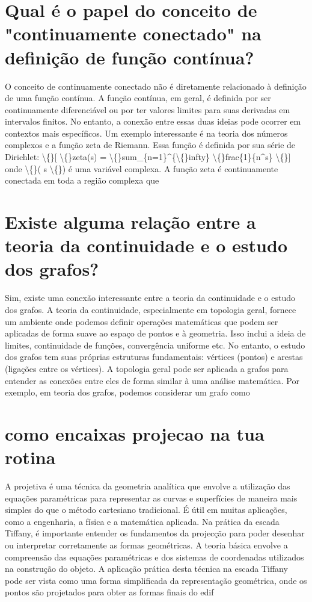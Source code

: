 \documentclass[11pt,a4paper]{article}
\begin{document}
\section{Qual é o papel do conceito de "continuamente conectado" na definição de função contínua?}
O conceito de continuamente conectado não é diretamente relacionado à definição de uma função contínua. A função contínua, em geral, é definida por ser continuamente diferenciável ou por ter valores limites para suas derivadas em intervalos finitos. No entanto, a conexão entre essas duas ideias pode ocorrer em contextos mais específicos. Um exemplo interessante é na teoria dos números complexos e a função zeta de Riemann. Essa função é definida por sua série de Dirichlet: \textbackslash\{\}[ \textbackslash\{\}zeta(s) = \textbackslash\{\}sum\_\{n=1\}^\{\textbackslash\{\}infty\} \textbackslash\{\}frac\{1\}\{n^s\} \textbackslash\{\}] onde \textbackslash\{\}( s \textbackslash\{\}) é uma variável complexa. A função zeta é continuamente conectada em toda a região complexa que

\section{Existe alguma relação entre a teoria da continuidade e o estudo dos grafos?}
Sim, existe uma conexão interessante entre a teoria da continuidade e o estudo dos grafos. A teoria da continuidade, especialmente em topologia geral, fornece um ambiente onde podemos definir operações matemáticas que podem ser aplicadas de forma suave ao espaço de pontos e à geometria. Isso inclui a ideia de limites, continuidade de funções, convergência uniforme etc. No entanto, o estudo dos grafos tem suas próprias estruturas fundamentais: vértices (pontos) e arestas (ligações entre os vértices). A topologia geral pode ser aplicada a grafos para entender as conexões entre eles de forma similar à uma análise matemática. Por exemplo, em teoria dos grafos, podemos considerar um grafo como

\section{como encaixas projecao na tua rotina}
A projetiva é uma técnica da geometria analítica que envolve a utilização das equações paramétricas para representar as curvas e superfícies de maneira mais simples do que o método cartesiano tradicional. É útil em muitas aplicações, como a engenharia, a física e a matemática aplicada. Na prática da escada Tiffany, é importante entender os fundamentos da projecção para poder desenhar ou interpretar corretamente as formas geométricas. A teoria básica envolve a compreensão das equações paramétricas e dos sistemas de coordenadas utilizados na construção do objeto. A aplicação prática desta técnica na escada Tiffany pode ser vista como uma forma simplificada da representação geométrica, onde os pontos são projetados para obter as formas finais do edif
\end{document}
